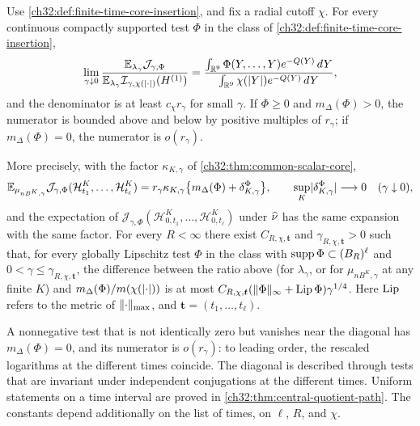 \begin{theorem}\label{ch32:thm:finite-time-core}\label{ch32:cor:endpoint-joint-core}
Use \cref{ch32:def:finite-time-core-insertion}, and fix a radial cutoff $\chi$. For every continuous compactly supported test $\Phi$ in the class of \cref{ch32:def:finite-time-core-insertion},
\[
 \lim_{\gamma\downarrow0}\frac{\mathbb E_{\lambda_\gamma}\mathcal J_{\gamma,\Phi}}{\mathbb E_{\lambda_\gamma}\mathcal I_{\gamma,\chi(\lvert \cdot\rvert)}(H^{(1)})}=\frac{\int_{\mathbb R^9}\Phi(Y,\dots,Y)e^{-Q(Y)}\,dY}{\int_{\mathbb R^9}\chi(\lvert Y\rvert)e^{-Q(Y)}\,dY},
\]
and the denominator is at least $c_\chi r_\gamma$ for small $\gamma$. If $\Phi\ge0$ and $m_\Delta(\Phi)>0$, the numerator is bounded above and below by positive multiples of $r_\gamma$; if $m_\Delta(\Phi)=0$, the numerator is $o(r_\gamma)$.

More precisely, with the factor $\kappa_{K,\gamma}$ of \cref{ch32:thm:common-scalar-core},
\[
 \mathbb E_{\mu_{nB^K,\gamma}}\mathcal J_{\gamma,\Phi}(\mathcal H^K_{t_1},\dots,\mathcal H^K_{t_\ell})=r_\gamma\kappa_{K,\gamma}\bigl\{m_\Delta(\Phi)+\delta^\Phi_{K,\gamma}\bigr\},\qquad\sup_K\lvert \delta^\Phi_{K,\gamma}\rvert\longrightarrow0\quad(\gamma\downarrow0),
\]
and the expectation of $\mathcal J_{\gamma,\Phi}(\mathcal H^K_{0,t_1},\dots,\mathcal H^K_{0,t_\ell})$ under $\widehat\nu$ has the same expansion with the same factor. For every $R<\infty$ there exist $C_{R,\chi,\boldsymbol t}$ and $\gamma_{R,\chi,\boldsymbol t}>0$ such that, for every globally Lipschitz test $\Phi$ in the class with $\operatorname{supp}\Phi\subset(B_R)^\ell$ and $0<\gamma\le\gamma_{R,\chi,\boldsymbol t}$, the difference between the ratio above (for $\lambda_\gamma$, or for $\mu_{nB^K,\gamma}$ at any finite $K$) and $m_\Delta(\Phi)/m(\chi(\lvert \cdot\rvert))$ is at most $C_{R,\chi,\boldsymbol t}(\lVert \Phi\rVert_\infty+\operatorname{Lip}\Phi)\gamma^{1/4}$. Here $\operatorname{Lip}$ refers to the metric of $\lVert \cdot\rVert_{\max}$, and $\boldsymbol t=(t_1,\dots,t_\ell)$.
\end{theorem}

A nonnegative test that is not identically zero but vanishes near the diagonal has $m_\Delta(\Phi)=0$, and its numerator is $o(r_\gamma)$: to leading order, the rescaled logarithms at the different times coincide. The diagonal is described through tests that are invariant under independent conjugations at the different times. Uniform statements on a time interval are proved in \cref{ch32:thm:central-quotient-path}. The constants depend additionally on the list of times, on $\ell$, $R$, and $\chi$.

